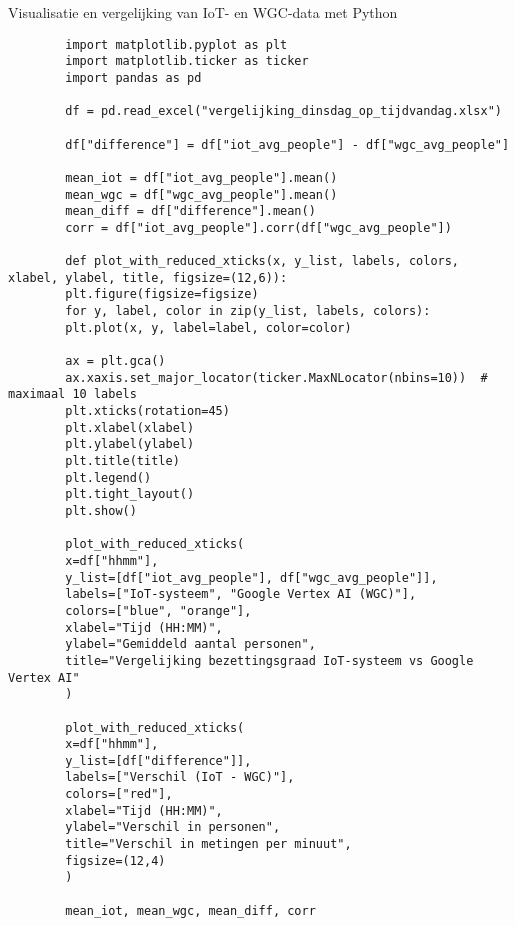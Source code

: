 \documentclass[dutch,dit,thesis]{hogentreport}
\begin{document}
\begin{listing}[H]
    \caption{Visualisatie en vergelijking van IoT- en WGC-data met Python}
    \label{lst:python-iot-wgc-plot}
    \begin{verbatim}
        import matplotlib.pyplot as plt
        import matplotlib.ticker as ticker
        import pandas as pd
        
        df = pd.read_excel("vergelijking_dinsdag_op_tijdvandag.xlsx")
        
        df["difference"] = df["iot_avg_people"] - df["wgc_avg_people"]
        
        mean_iot = df["iot_avg_people"].mean()
        mean_wgc = df["wgc_avg_people"].mean()
        mean_diff = df["difference"].mean()
        corr = df["iot_avg_people"].corr(df["wgc_avg_people"])
        
        def plot_with_reduced_xticks(x, y_list, labels, colors, xlabel, ylabel, title, figsize=(12,6)):
        plt.figure(figsize=figsize)
        for y, label, color in zip(y_list, labels, colors):
        plt.plot(x, y, label=label, color=color)
        
        ax = plt.gca()
        ax.xaxis.set_major_locator(ticker.MaxNLocator(nbins=10))  # maximaal 10 labels
        plt.xticks(rotation=45)
        plt.xlabel(xlabel)
        plt.ylabel(ylabel)
        plt.title(title)
        plt.legend()
        plt.tight_layout()
        plt.show()
        
        plot_with_reduced_xticks(
        x=df["hhmm"],
        y_list=[df["iot_avg_people"], df["wgc_avg_people"]],
        labels=["IoT-systeem", "Google Vertex AI (WGC)"],
        colors=["blue", "orange"],
        xlabel="Tijd (HH:MM)",
        ylabel="Gemiddeld aantal personen",
        title="Vergelijking bezettingsgraad IoT-systeem vs Google Vertex AI"
        )
        
        plot_with_reduced_xticks(
        x=df["hhmm"],
        y_list=[df["difference"]],
        labels=["Verschil (IoT - WGC)"],
        colors=["red"],
        xlabel="Tijd (HH:MM)",
        ylabel="Verschil in personen",
        title="Verschil in metingen per minuut",
        figsize=(12,4)
        )
        
        mean_iot, mean_wgc, mean_diff, corr
    \end{verbatim}
\end{listing}


\end{document}
